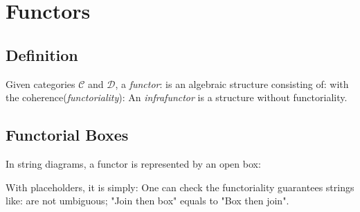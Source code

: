 \section{Functors}

\subsection{Definition}
Given categories $\mathcal{C}$ and $\mathcal{D}$, a \textit{functor}:
is an algebraic structure consisting of:
with the coherence(\textit{functoriality}):
An \textit{infrafunctor} is a structure without functoriality.

\subsection{Functorial Boxes}

In string diagrams, a functor is represented by an open box:

With placeholders, it is simply:
One can check the functoriality guarantees strings like:
are not umbiguous; "Join then box" equals to "Box then join".


